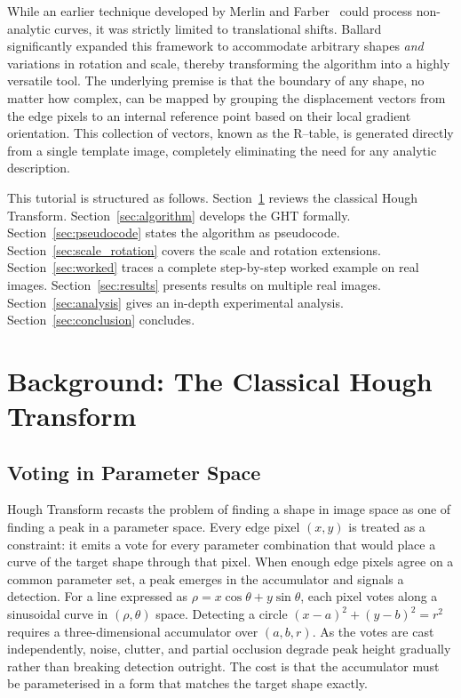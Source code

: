 \documentclass[12pt,a4paper]{article}
\begin{document}
While an earlier technique developed by Merlin and Farber~\cite{merlin1975} could process non-analytic curves, it was strictly limited to translational shifts. Ballard~\cite{ballard1981} significantly expanded this framework to accommodate arbitrary shapes \emph{and} variations in rotation and scale, thereby transforming the algorithm into a highly versatile tool. The underlying premise is that the boundary of any shape, no matter how complex, can be mapped by grouping the displacement vectors from the edge pixels to an internal reference point based on their local gradient orientation. This collection of vectors, known as the R--table, is generated directly from a single template image, completely eliminating the need for any analytic description.

This tutorial is structured as follows.  Section~\ref{sec:background} reviews the
classical Hough Transform.  Section~\ref{sec:algorithm} develops the GHT formally.
Section~\ref{sec:pseudocode} states the algorithm as pseudocode.
Section~\ref{sec:scale_rotation} covers the scale and rotation extensions.
Section~\ref{sec:worked} traces a complete step-by-step worked example on real images.
Section~\ref{sec:results} presents results on multiple real images.
Section~\ref{sec:analysis} gives an in-depth experimental analysis.
Section~\ref{sec:conclusion} concludes.

\section{Background: The Classical Hough Transform}
\label{sec:background}

\subsection{Voting in Parameter Space}

Hough Transform recasts the problem of finding a shape in image
space as one of finding a peak in a parameter space.  Every edge pixel $(x, y)$ is
treated as a constraint: it emits a vote for every parameter combination that would
place a curve of the target shape through that pixel.  When enough edge pixels agree
on a common parameter set, a peak emerges in the accumulator and signals a detection.
For a line expressed as $\rho = x\cos\theta + y\sin\theta$, each pixel votes along a
sinusoidal curve in $(\rho, \theta)$ space.  Detecting a circle
$(x-a)^2 + (y-b)^2 = r^2$ requires a three-dimensional accumulator over $(a, b, r)$. As the votes are cast independently, noise,
clutter, and partial occlusion degrade peak height gradually rather than breaking
detection outright.  The cost is that the accumulator must be parameterised in a form
that matches the target shape exactly.
\end{document}
